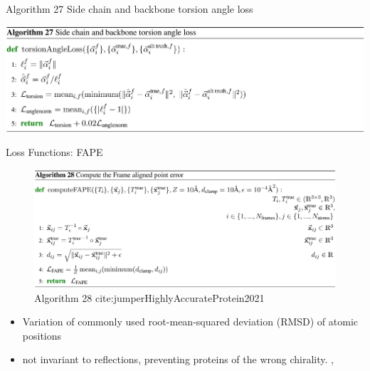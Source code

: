\documentclass[presentation, smaller]{beamer}
\begin{document}
\begin{frame}[label={sec:org62ff09d}]{Algorithm 27 Side chain and backbone torsion angle loss \cite{jumperHighlyAccurateProtein2021}}
\begin{center}
\includegraphics[width=.9\linewidth]{./imgs/algo27_sidechain-backbonetorsion-loss.png}
\end{center}
\end{frame}
\begin{frame}[label={sec:orgd2b0589}]{Loss Functions: FAPE}
\begin{figure}[htbp]
\centering
\includegraphics[width=.9\linewidth]{./imgs/algo28_fape.png}
{Algorithm 28 cite:jumperHighlyAccurateProtein2021}
\end{figure}


\begin{itemize}
\item Variation of commonly used root-mean-squared deviation (RMSD) of atomic positions
\item not invariant to reflections, preventing proteins of the wrong chirality. \cite{rubieraAlphaFoldHereWhat}, \cite{jumperHighlyAccurateProtein2021}
\end{itemize}
\end{frame}
\end{document}
